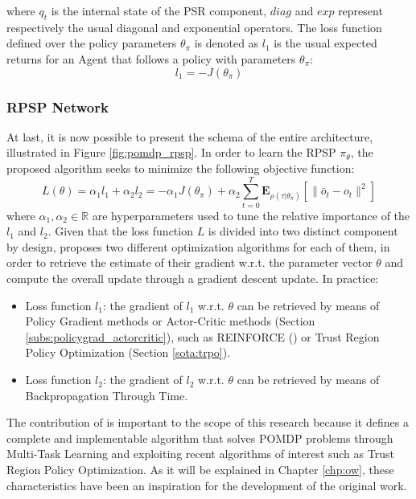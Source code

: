                 where $q_t$ is the internal state of the PSR component, $diag$ and $exp$ represent respectively the usual diagonal and exponential operators. \newline
                The loss function defined over the policy parameters $\theta_\pi$ is denoted as $l_1$ is the usual expected returns for an Agent that follows a policy with parameters $\theta_\pi$:
                \[ l_1 = -J(\theta_\pi)\]
            
            \subsubsection{RPSP Network}
                At last, it is now possible to present the schema of the entire architecture, illustrated in Figure \ref{fig:pomdp_rpsp}. In order to learn the RPSP $\pi_\theta$, the proposed algorithm seeks to minimize the following objective function:
                \[ L(\theta) = \alpha_{1} l_1 + \alpha_{2} l_2 = - \alpha_1 J(\theta_\pi) + \alpha_2 \sum_{t=0}^{T} \mathbf{E}_{\rho(\tau|\theta_\pi)} \left[ \| \bar{o}_t - o_t \|^2 \right]\]
                where $\alpha_1, \alpha_2 \in \mathbb{R}$ are hyperparameters used to tune the relative importance of the $l_1$ and $l_2$. Given that the loss function $L$ is divided into two distinct component by design,  proposes two different optimization algorithms for each of them, in order to retrieve the estimate of their gradient w.r.t. the parameter vector $\theta$ and compute the overall update through a gradient descent update. In practice:
                \begin{itemize}
                    \item Loss function $l_1$: the gradient of $l_1$ w.r.t. $\theta$ can be retrieved by means of Policy Gradient methods or Actor-Critic methods (Section \ref{subs:policygrad_actorcritic}), such as REINFORCE () or Trust Region Policy Optimization (Section \ref{sota:trpo}).
                    \item Loss function $l_2$: the gradient of $l_2$ w.r.t. $\theta$ can be retrieved by means of Backpropagation Through Time.
                \end{itemize}
                \noindent
                The contribution of  is important to the scope of this research because it defines a complete and implementable algorithm that solves POMDP problems through Multi-Task Learning and exploiting recent algorithms of interest such as Trust Region Policy Optimization. As it will be explained in Chapter \ref{chp:ow}, these characteristics have been an inspiration for the development of the original work.
                
